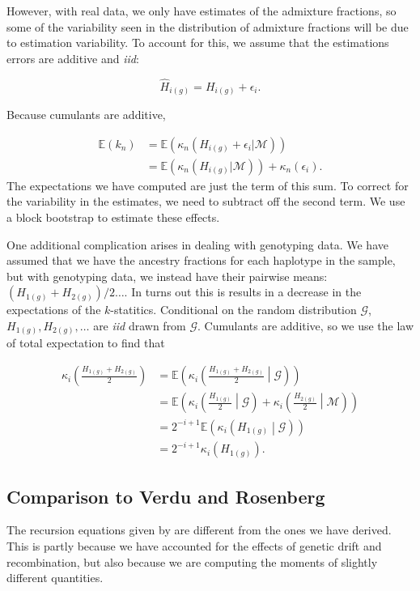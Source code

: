 \documentclass[11pt]{amsart}
\begin{document}
However, with real data, we only have estimates of the admixture fractions, so some of the variability seen in the distribution of admixture fractions will be due to estimation variability.
To account for this, we assume that the estimations errors are additive and \textit{iid}:

$$\hat{H}_{i(g)}=H_{i(g)}+\epsilon_i.$$

Because cumulants are additive, 

\begin{align*}
	\mathbb{E}(k_n)&=\mathbb{E}\left(\kappa_n(H_{i(g)}+\epsilon_i|\mathcal{M})\right)\\
	&=\mathbb{E}\left(\kappa_n(H_{i(g)}|\mathcal{M})\right)+\kappa_n(\epsilon_i).
\end{align*}
The expectations we have computed are just the term of this sum.
To correct for the variability in the estimates, we need to subtract off the second term. 
We use a block bootstrap to estimate these effects.

One additional complication arises in dealing with genotyping data. We have assumed that we have the ancestry fractions for each haplotype in the sample, but with genotyping data, we instead have their pairwise means: $(H_{1(g)}+H_{2(g)})/2\dots$. In turns out this is results in a decrease in the expectations of the $k$-statitics. Conditional on the random distribution $\mathcal{G}$, $H_{1(g)},H_{2(g)},\dots$ are \textit{iid} drawn from $\mathcal{G}$.
Cumulants are additive, so we use the law of total expectation to find that

\begin{align*}
	\kappa_i\left(\frac{H_{1(g)}+H_{2(g)}}{2}\right)
		&=\mathbb{E}\left(\kappa_i\left(\frac{H_{1(g)}+H_{2(g)}}{2}\middle\vert\mathcal{G}\right)\right)\\
		&=\mathbb{E}\left(\kappa_i\left(\frac{H_{1(g)}}{2}\middle\vert\mathcal{G}\right)+\kappa_i\left(\frac{H_{2(g)}}{2}\middle\vert\mathcal{M}\right)\right)\\
		&=2^{-i+1}\mathbb{E}\left(\kappa_i\left(H_{1(g)}\middle\vert\mathcal{G}\right)\right)\\
		&=2^{-i+1}\kappa_i\left(H_{1(g)}\right).
\end{align*}

\subsection*{Comparison to Verdu and Rosenberg}
The recursion equations given by \citet{verdu2011general} are different from the ones we have derived. This is partly because we have accounted for the effects of genetic drift and recombination, but also because we are computing the moments of slightly different quantities.
\end{document}
